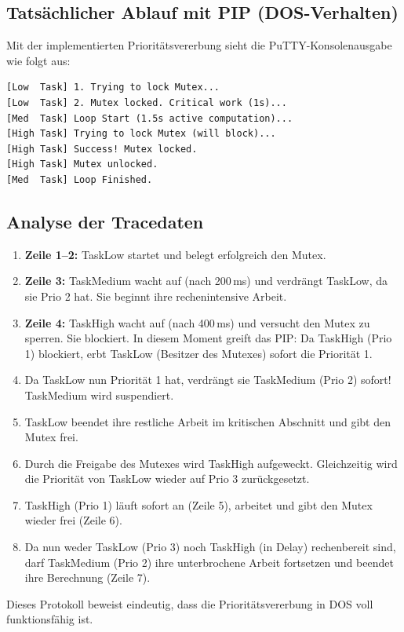 \subsection{Tatsächlicher Ablauf mit PIP (DOS-Verhalten)}
Mit der implementierten Prioritätsvererbung sieht die PuTTY-Konsolenausgabe wie folgt aus:

\begin{lstlisting}[basicstyle=\ttfamily\footnotesize, caption={Konsolenausgabe des PIP-Tests in PuTTY}]
[Low  Task] 1. Trying to lock Mutex...
[Low  Task] 2. Mutex locked. Critical work (1s)...
[Med  Task] Loop Start (1.5s active computation)...
[High Task] Trying to lock Mutex (will block)...
[High Task] Success! Mutex locked.
[High Task] Mutex unlocked.
[Med  Task] Loop Finished.
\end{lstlisting}

\subsection{Analyse der Tracedaten}
\begin{enumerate}
    \item \textbf{Zeile 1--2:} TaskLow startet und belegt erfolgreich den Mutex.
    \item \textbf{Zeile 3:} TaskMedium wacht auf (nach 200\,ms) und verdrängt TaskLow, da sie Prio 2 hat. Sie beginnt ihre rechenintensive Arbeit.
    \item \textbf{Zeile 4:} TaskHigh wacht auf (nach 400\,ms) und versucht den Mutex zu sperren. Sie blockiert. In diesem Moment greift das PIP: Da TaskHigh (Prio 1) blockiert, erbt TaskLow (Besitzer des Mutexes) sofort die Priorität 1.
    \item Da TaskLow nun Priorität 1 hat, verdrängt sie TaskMedium (Prio 2) sofort! TaskMedium wird suspendiert.
    \item TaskLow beendet ihre restliche Arbeit im kritischen Abschnitt und gibt den Mutex frei.
    \item Durch die Freigabe des Mutexes wird TaskHigh aufgeweckt. Gleichzeitig wird die Priorität von TaskLow wieder auf Prio 3 zurückgesetzt.
    \item TaskHigh (Prio 1) läuft sofort an (Zeile 5), arbeitet und gibt den Mutex wieder frei (Zeile 6).
    \item Da nun weder TaskLow (Prio 3) noch TaskHigh (in Delay) rechenbereit sind, darf TaskMedium (Prio 2) ihre unterbrochene Arbeit fortsetzen und beendet ihre Berechnung (Zeile 7).
\end{enumerate}
Dieses Protokoll beweist eindeutig, dass die Prioritätsvererbung in DOS voll funktionsfähig ist.

